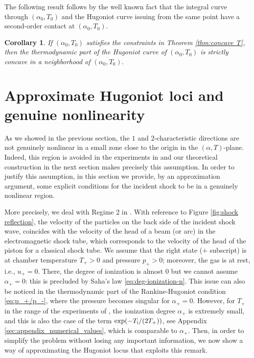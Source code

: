 \documentclass[10pt,a4paper]{article}
\newtheorem{corollary}{Corollary}[section]
\numberwithin{equation}{section}
\newcommand{\Ti}{T_{\rm i}}
\begin{document}
The following result follows by the well known fact that the integral curve through $(\alpha_0,T_0)$ and the Hugoniot curve issuing from the same point have a second-order contact at  $(\alpha_0, T_0)$. 

\begin{corollary}\label{cor:concave T} If $(\alpha_0, T_0)$ satisfies the constraints in Theorem \ref{thm:concave T}, then the thermodynamic part of the Hugoniot curve  of $(\alpha_0, T_0)$ is strictly concave in a neighborhood of $(\alpha_0, T_0).$
\end{corollary}

\section{Approximate Hugoniot loci and genuine nonlinearity}\label{sec:incident shock}
%
%
As we showed in the previous section, the $1$ and $2$-characteristic directions are not genuinely nonlinear in a small zone close to the origin in the $(\alpha,T)$-plane. Indeed, this region is avoided in the experiments in \cite{Fukuda-Okasaka-Fujimoto} and our theoretical construction in the next section makes precisely this assumption. In order to justify this assumption, in this section we provide, by an approximation argument, some explicit conditions for the incident shock to be in a genuinely nonlinear region.

More precisely, we deal with  Regime 2 in \cite{Fukuda-Okasaka-Fujimoto}. With reference to Figure \ref{fig:shock reflection},  the velocity of the particles on the back side of the incident shock wave, coincides with the velocity of the head of a beam (or arc) in the electromagnetic shock tube, which corresponds to the velocity of the head of the piston for a classical shock tube. We assume that the right state ($+$ subscript) is at chamber temperature $T_+>0$ and pressure $p_+>0$; moreover, the gas is at rest, i.e., $u_+=0$. There, the degree of ionization is almost $0$ but we cannot assume $\alpha_+=0$:  this is precluded by Saha's law \eqref{eq:deg-ionization-n}.  This issue can also be noticed in the thermodynamic part of the Rankine-Hugoniot condition \eqref{eq:p_+/p_-}, where the pressure becomes singular for $\alpha_+=0$.  However, for $T_{+}$ in the range of the experiments of \cite{Fukuda-Okasaka-Fujimoto}, the ionization degree $\alpha_+$ is extremely small, and this is also the case of the term $\exp(-\Ti/(2T_{+}))$,
see Appendix \ref{sec:appendix_numerical_values}, which is comparable to $\alpha_+$. Then, in order to simplify the problem without losing any important information, we now show a way of approximating the Hugoniot locus that exploits this remark.
\end{document}

